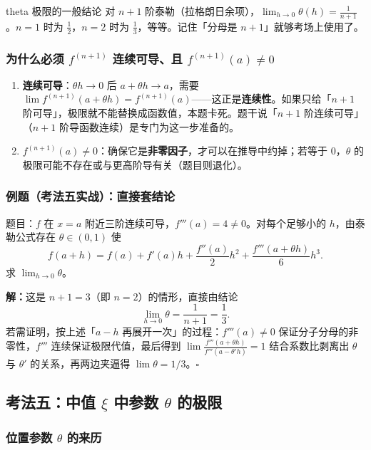 \documentclass[a4paper]{article}
\begin{document}
\begin{knowledgebox}{theta 极限的一般结论}
对 $n+1$ 阶泰勒（拉格朗日余项），$\lim_{h\to0}\theta(h)=\frac{1}{n+1}$。$n=1$ 时为 $\frac12$，$n=2$ 时为 $\frac13$，等等。记住「分母是 $n+1$」就够考场上使用了。
\end{knowledgebox}

\subsubsection{为什么必须 $f^{(n+1)}$ 连续可导、且 $f^{(n+1)}(a)\neq0$}

\begin{enumerate}
\item \textbf{连续可导}：$\theta h\to0$ 后 $a+\theta h\to a$，需要 $\lim f^{(n+1)}(a+\theta h)=f^{(n+1)}(a)$——这正是\textbf{连续性}。如果只给「$n+1$ 阶可导」，极限就不能替换成函数值，本题卡死。题干说「$n+1$ 阶连续可导」（$n+1$ 阶导函数连续）是专门为这一步准备的。
\item \textbf{$f^{(n+1)}(a)\neq0$}：确保它是\textbf{非零因子}，才可以在推导中约掉；若等于 0，$\theta$ 的极限可能不存在或与更高阶导有关（题目则退化）。
\end{enumerate}

\subsubsection{例题（考法五实战）：直接套结论}

题目：$f$ 在 $x=a$ 附近三阶连续可导，$f'''(a)=4\neq0$。对每个足够小的 $h$，由泰勒公式存在 $\theta\in(0,1)$ 使
\[
f(a+h)=f(a)+f'(a)h+\frac{f''(a)}2h^2+\frac{f'''(a+\theta h)}6h^3 .
\]
求 $\lim_{h\to0}\theta$。

\textbf{解：}这是 $n+1=3$（即 $n=2$）的情形，直接由结论
\[
\lim_{h\to0}\theta=\frac{1}{n+1}=\frac13.
\]
若需证明，按上述「$a-h$ 再展开一次」的过程：$f'''(a)\neq0$ 保证分子分母的非零性，$f'''$ 连续保证极限代值，最后得到 $\lim \frac{f'''(a+\theta h)}{f'''(a-\theta' h)}=1$ 结合系数比剥离出 $\theta$ 与 $\theta'$ 的关系，再两边夹逼得 $\lim\theta=1/3$。$\square$

\subsection{考法五：中值 $\xi$ 中参数 $\theta$ 的极限}

\subsubsection{位置参数 $\theta$ 的来历}
\end{document}
